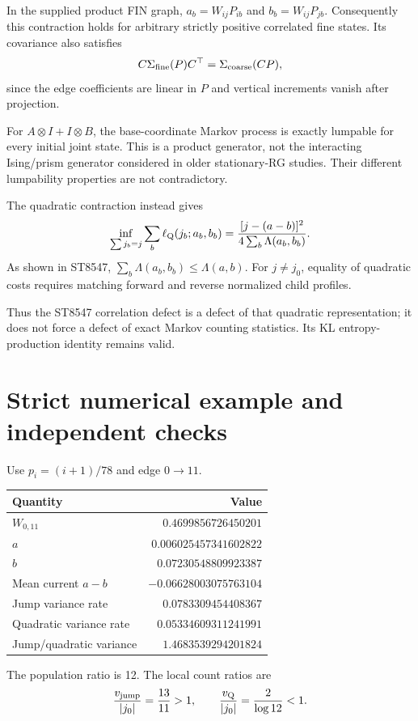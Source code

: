 \documentclass[11pt,a4paper]{article}
\begin{document}
In the supplied product FIN graph, \(a_b=W_{ij}P_{ib}\) and
\(b_b=W_{ij}P_{jb}\). Consequently this contraction holds for arbitrary
strictly positive correlated fine states. Its covariance also satisfies
\[
C\Sigma_{\rm fine}(P)C^\top=\Sigma_{\rm coarse}(CP),
\]
since the edge coefficients are linear in \(P\) and vertical increments
vanish after projection.

For \(A\otimes I+I\otimes B\), the base-coordinate Markov process is exactly
lumpable for every initial joint state. This is a product generator, not
the interacting Ising/prism generator considered in older stationary-RG
studies. Their different lumpability properties are not contradictory.

The quadratic contraction instead gives
\[
\inf_{\sum j_b=j}\sum_b\ell_{\rm Q}(j_b;a_b,b_b)
=\frac{[j-(a-b)]^2}{4\sum_b\Lambda(a_b,b_b)}.
\]
As shown in ST8547,
\(\sum_b\Lambda(a_b,b_b)\le\Lambda(a,b)\).
For \(j\ne j_0\), equality of quadratic costs requires matching forward
and reverse normalized child profiles.

Thus the ST8547 correlation defect is a defect of that quadratic
representation; it does not force a defect of exact Markov counting
statistics. Its KL entropy-production identity remains valid.

\section{Strict numerical example and independent checks}\label{verification}

Use \(p_i=(i+1)/78\) and edge \(0\to11\).
\begin{center}
\begin{tabular}{lr}
\toprule
Quantity & Value\\
\midrule
\(W_{0,11}\) & \(0.4699856726450201\)\\
\(a\) & \(0.006025457341602822\)\\
\(b\) & \(0.07230548809923387\)\\
Mean current \(a-b\) & \(-0.06628003075763104\)\\
Jump variance rate & \(0.0783309454408367\)\\
Quadratic variance rate & \(0.05334609311241991\)\\
Jump/quadratic variance & \(1.4683539294201824\)\\
\bottomrule
\end{tabular}
\end{center}
The population ratio is 12. The local count ratios are
\[
\frac{v_{\rm jump}}{|j_0|}=\frac{13}{11}>1,\qquad
\frac{v_{\rm Q}}{|j_0|}=\frac2{\log12}<1.
\]
\end{document}
